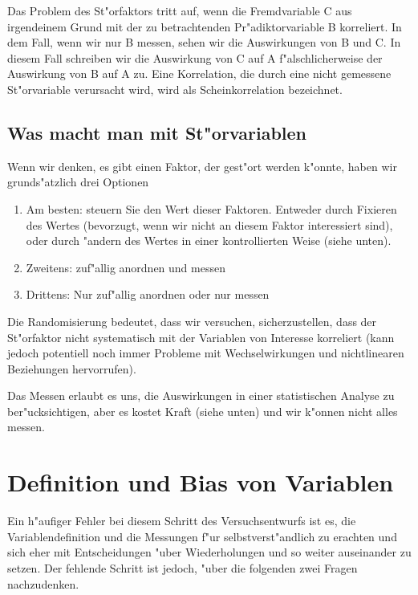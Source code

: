 \documentclass[a4paper,twoside]{tufte-book}\usepackage[]{graphicx}\usepackage[]{color}
\begin{document}
Das Problem des St"orfaktors tritt auf, wenn die Fremdvariable C aus irgendeinem Grund mit der zu betrachtenden Pr"adiktorvariable B korreliert. In dem Fall, wenn wir nur B messen, sehen wir die Auswirkungen von B und C. In diesem Fall schreiben wir die Auswirkung von C auf A f"alschlicherweise der Auswirkung von B auf A zu.  Eine Korrelation, die durch eine nicht gemessene St"orvariable verursacht wird, wird als Scheinkorrelation bezeichnet.

\subsection{Was macht man mit St"orvariablen}

Wenn wir denken, es gibt einen Faktor, der gest"ort werden k"onnte, haben wir grunds"atzlich drei Optionen

\begin{enumerate}
\item Am besten: steuern Sie den Wert dieser Faktoren. Entweder durch Fixieren des Wertes (bevorzugt, wenn wir nicht an diesem Faktor interessiert sind), oder durch "andern des Wertes in einer kontrollierten Weise (siehe unten).
\item Zweitens: zuf"allig anordnen und messen
\item Drittens: Nur zuf"allig anordnen oder nur messen
\end{enumerate}

Die Randomisierung bedeutet, dass wir versuchen, sicherzustellen, dass der St"orfaktor nicht systematisch mit der Variablen von Interesse korreliert (kann jedoch potentiell noch immer Probleme mit Wechselwirkungen und nichtlinearen Beziehungen hervorrufen).


Das Messen erlaubt es uns, die Auswirkungen in einer statistischen Analyse zu ber"ucksichtigen, aber es kostet Kraft (siehe unten) und wir k"onnen nicht alles messen.
\section{Definition und Bias von Variablen}

Ein h"aufiger Fehler bei diesem Schritt des Versuchsentwurfs ist es, die Variablendefinition und die Messungen f"ur selbstverst"andlich zu erachten und sich eher mit Entscheidungen "uber Wiederholungen und so weiter auseinander zu setzen. Der fehlende Schritt ist jedoch, "uber die folgenden zwei Fragen nachzudenken. 
\end{document}
